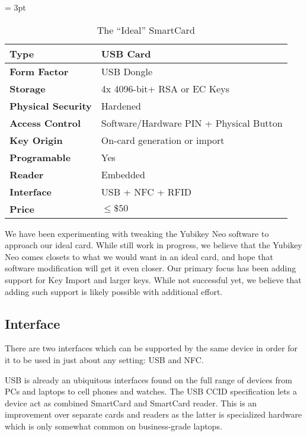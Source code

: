 \documentclass[11pt, twocolumn]{article}
\begin{document}
\begin{table*}[!htb]
  \vspace{3ex}
  \begin{center}
    \tabulinesep = 3pt
    \begin{tabu} to \textwidth
      { | X[1,c,m]
        | X[2,c,m]
        | }
      \hline
      \textbf{Type}
      & USB Card
      \\ \hline
      \textbf{Form Factor}
      & USB Dongle
      \\ \hline
      \textbf{Storage}
      & 4x 4096-bit+ RSA or EC Keys
      \\ \hline
      \textbf{Physical Security}
      & Hardened
      \\ \hline
      \textbf{Access Control}
      & Software/Hardware PIN + Physical Button
      \\ \hline
      \textbf{Key Origin}
      & On-card generation or import
      \\ \hline
      \textbf{Programable}
      & Yes
      \\ \hline
      \textbf{Reader}
      & Embedded
      \\ \hline
      \textbf{Interface}
      & USB + NFC + RFID
      \\ \hline
      \textbf{Price}
      & $\le\$50$
      \\ \hline
      \end{tabu}
  \end{center}
  \caption{The ``Ideal'' SmartCard}
  \label{tab:ideal}
\end{table*}

We have been experimenting with tweaking the Yubikey Neo software to
approach our ideal card. While still work in progress, we believe that
the Yubikey Neo comes closets to what we would want in an ideal card,
and hope that software modification will get it even closer. Our
primary focus has been adding support for Key Import and larger
keys. While not successful yet, we believe that adding such support is
likely possible with additional effort.

\subsection{Interface}

There are two interfaces which can be supported by the same device in order for
it to be used in just about any setting: USB and NFC.

USB is already an ubiquitous interfaces found on the full range of devices from
PCs and laptops to cell phones and watches. The USB CCID specification lets a
device act as combined SmartCard and SmartCard reader. This is an improvement
over separate cards and readers as the latter is specialized hardware which is
only somewhat common on business-grade laptops.
\end{document}
